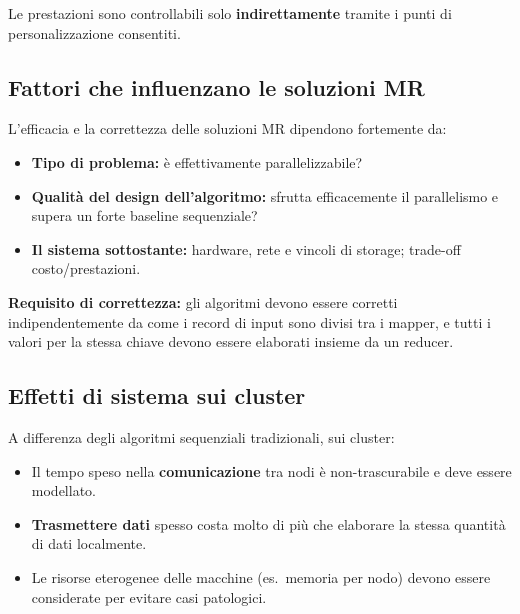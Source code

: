 \begin{importante}
  Le prestazioni sono controllabili solo \textbf{indirettamente} tramite
  i punti di personalizzazione consentiti.
\end{importante}

\subsection{Fattori che influenzano le soluzioni MR}

L'efficacia e la correttezza delle soluzioni MR dipendono fortemente da:
\begin{itemize}
  \item \textbf{Tipo di problema:} è effettivamente parallelizzabile?
  \item \textbf{Qualità del design dell'algoritmo:} sfrutta efficacemente
    il parallelismo e supera un forte baseline sequenziale?
  \item \textbf{Il sistema sottostante:} hardware, rete e vincoli di storage;
    trade-off costo/prestazioni.
\end{itemize}

\begin{importante}
  \textbf{Requisito di correttezza:} gli algoritmi devono essere corretti
  indipendentemente da come i record di input sono divisi tra i mapper,
  e tutti i valori per la stessa chiave devono essere elaborati insieme
  da un reducer.
\end{importante}

\subsection{Effetti di sistema sui cluster}

A differenza degli algoritmi sequenziali tradizionali, sui cluster:
\begin{itemize}
  \item Il tempo speso nella \textbf{comunicazione} tra nodi è
    non-trascurabile e deve essere modellato.
  \item \textbf{Trasmettere dati} spesso costa molto di più che elaborare
    la stessa quantità di dati localmente.
  \item Le risorse eterogenee delle macchine (es.\ memoria per nodo)
    devono essere considerate per evitare casi patologici.
\end{itemize}


